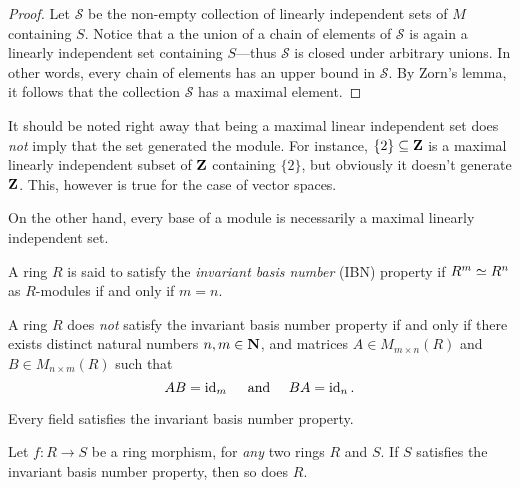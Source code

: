 \begin{proof}
    Let \(\mathcal{S}\) be the non-empty collection of linearly independent sets of
    \(M\) containing \(S\). Notice that a the union of a chain of elements of
    \(\mathcal{S}\) is again a linearly independent set containing \(S\)---thus
    \(\mathcal{S}\) is closed under arbitrary unions. In other words, every chain of
    elements has an upper bound in \(\mathcal{S}\). By Zorn's lemma, it follows that
    the collection \(\mathcal{S}\) has a maximal element.
\end{proof}

\begin{remark}
    \label{rem:maximality-not-generation}
    It should be noted right away that being a maximal linear independent set does
    \emph{not} imply that the set generated the module. For instance,
    \(\{2\} \subseteq \mathbf{Z}\) is a maximal linearly independent subset of \(\mathbf{Z}\)
    containing \(\{2\}\), but obviously it doesn't generate \(\mathbf{Z}\). This, however is
    true for the case of vector spaces.

    On the other hand, every base of a module is necessarily a maximal linearly
    independent set.
\end{remark}

\begin{definition}
    \label{def:IBN}
    A ring \(R\) is said to satisfy the \emph{invariant basis number} (IBN) property
    if \(R^m \simeq R^n\) as \(R\)-modules if and only if \(m = n\).
\end{definition}

\begin{corollary}
    \label{cor:IBN-matrix-criterion}
    A ring \(R\) does \emph{not} satisfy the invariant basis number property if and
    only if there exists distinct natural numbers \(n, m \in \mathbf{N}\), and matrices \(A
    \in M_{m \times n}(R)\) and \(B \in M_{n \times m}(R)\) such that
    \[
        A B = \operatorname{id}_m\quad \text{ and }\quad B A = \operatorname{id}_n.
    \]
\end{corollary}

\begin{corollary}
    \label{cor:fields-are-IBN}
    Every field satisfies the invariant basis number property.
\end{corollary}

\begin{proposition}
    \label{prop:IBN-morphism-criterion}
    Let \(f: R \to S\) be a ring morphism, for \emph{any} two rings \(R\) and
    \(S\). If \(S\) satisfies the invariant basis number property, then so does
    \(R\).
\end{proposition}

